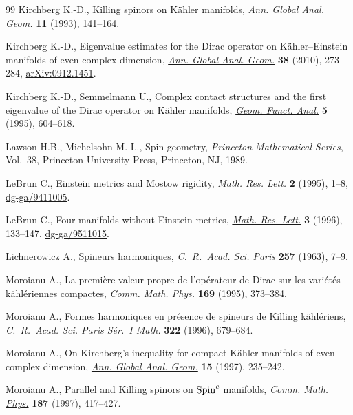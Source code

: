 \documentclass[10pt,a4paper]{amsart}
\numberwithin{equation}{section}
\theoremstyle{definition}
\begin{document}
\begin{thebibliography}{99}
Kirchberg K.-D., Killing spinors on {K}\"ahler manifolds, \href{http://dx.doi.org/10.1007/BF00773453}{\textit{Ann. Global
  Anal. Geom.}} \textbf{11} (1993), 141--164.

Kirchberg K.-D., Eigenvalue estimates for the {D}irac operator on
  {K}\"ahler--{E}instein manifolds of even complex dimension, \href{http://dx.doi.org/10.1007/s10455-010-9212-6}{\textit{Ann.
  Global Anal. Geom.}} \textbf{38} (2010), 273--284, \href{http://arxiv.org/abs/0912.1451}{arXiv:0912.1451}.

Kirchberg K.-D., Semmelmann U., Complex contact structures and the f\/irst
  eigenvalue of the {D}irac operator on {K}\"ahler manifolds, \href{http://dx.doi.org/10.1007/BF01895834}{\textit{Geom.
  Funct. Anal.}} \textbf{5} (1995), 604--618.

Lawson H.B., Michelsohn M.-L., Spin geometry, \textit{Princeton Mathematical
  Series}, Vol.~38, Princeton University Press, Princeton, NJ, 1989.

LeBrun C., Einstein metrics and {M}ostow rigidity, \href{http://dx.doi.org/10.4310/MRL.1995.v2.n1.a1}{\textit{Math. Res. Lett.}}
  \textbf{2} (1995), 1--8, \href{http://arxiv.org/abs/dg-ga/9411005}{dg-ga/9411005}.

LeBrun C., Four-manifolds without {E}instein metrics, \href{http://dx.doi.org/10.4310/MRL.1996.v3.n2.a1}{\textit{Math. Res. Lett.}}
  \textbf{3} (1996), 133--147, \href{http://arxiv.org/abs/dg-ga/9511015}{dg-ga/9511015}.

Lichnerowicz A., Spineurs harmoniques, \textit{C.~R.~Acad. Sci. Paris}
  \textbf{257} (1963), 7--9.

Moroianu A., La premi\`ere valeur propre de l'op\'erateur de {D}irac sur les
  vari\'et\'es k\"ahl\'eriennes compactes, \href{http://dx.doi.org/10.1007/BF02099477}{\textit{Comm. Math. Phys.}}
  \textbf{169} (1995), 373--384.

Moroianu A., Formes harmoniques en pr\'esence de spineurs de {K}illing
  k\"ahl\'eriens, \textit{C.~R.~Acad. Sci. Paris S\'er.~I Math.} \textbf{322}
  (1996), 679--684.

Moroianu A., On {K}irchberg's inequality for compact {K}\"ahler manifolds of
  even complex dimension, \href{http://dx.doi.org/10.1023/A:1006543304443}{\textit{Ann. Global Anal. Geom.}} \textbf{15} (1997),
  235--242.

Moroianu A., Parallel and {K}illing spinors on {${\rm Spin}^c$} manifolds,
  \href{http://dx.doi.org/10.1007/s002200050142}{\textit{Comm. Math. Phys.}} \textbf{187} (1997), 417--427.


\end{thebibliography}
\end{document}
